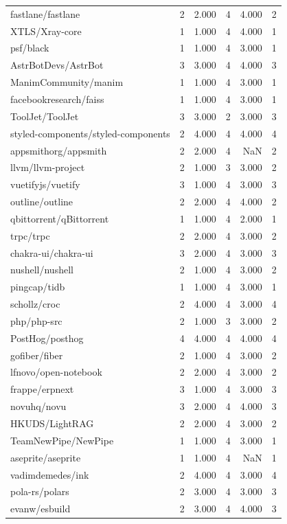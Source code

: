 \begin{tabular}{lrrrrr}
fastlane/fastlane & 2 & 2.000 & 4 & 4.000 & 2 \\
XTLS/Xray-core & 1 & 1.000 & 4 & 4.000 & 1 \\
psf/black & 1 & 1.000 & 4 & 3.000 & 1 \\
AstrBotDevs/AstrBot & 3 & 3.000 & 4 & 4.000 & 3 \\
ManimCommunity/manim & 1 & 1.000 & 4 & 3.000 & 1 \\
facebookresearch/faiss & 1 & 1.000 & 4 & 3.000 & 1 \\
ToolJet/ToolJet & 3 & 3.000 & 2 & 3.000 & 3 \\
styled-components/styled-components & 2 & 4.000 & 4 & 4.000 & 4 \\
appsmithorg/appsmith & 2 & 2.000 & 4 & NaN & 2 \\
llvm/llvm-project & 2 & 1.000 & 3 & 3.000 & 2 \\
vuetifyjs/vuetify & 3 & 1.000 & 4 & 3.000 & 3 \\
outline/outline & 2 & 2.000 & 4 & 4.000 & 2 \\
qbittorrent/qBittorrent & 1 & 1.000 & 4 & 2.000 & 1 \\
trpc/trpc & 2 & 2.000 & 4 & 3.000 & 2 \\
chakra-ui/chakra-ui & 3 & 2.000 & 4 & 3.000 & 3 \\
nushell/nushell & 2 & 1.000 & 4 & 3.000 & 2 \\
pingcap/tidb & 1 & 1.000 & 4 & 3.000 & 1 \\
schollz/croc & 2 & 4.000 & 4 & 3.000 & 4 \\
php/php-src & 2 & 1.000 & 3 & 3.000 & 2 \\
PostHog/posthog & 4 & 4.000 & 4 & 4.000 & 4 \\
gofiber/fiber & 2 & 1.000 & 4 & 3.000 & 2 \\
lfnovo/open-notebook & 2 & 2.000 & 4 & 3.000 & 2 \\
frappe/erpnext & 3 & 1.000 & 4 & 3.000 & 3 \\
novuhq/novu & 3 & 2.000 & 4 & 4.000 & 3 \\
HKUDS/LightRAG & 2 & 2.000 & 4 & 3.000 & 2 \\
TeamNewPipe/NewPipe & 1 & 1.000 & 4 & 3.000 & 1 \\
aseprite/aseprite & 1 & 1.000 & 4 & NaN & 1 \\
vadimdemedes/ink & 2 & 4.000 & 4 & 3.000 & 4 \\
pola-rs/polars & 2 & 3.000 & 4 & 3.000 & 3 \\
evanw/esbuild & 2 & 3.000 & 4 & 4.000 & 3 \\

\end{tabular}
